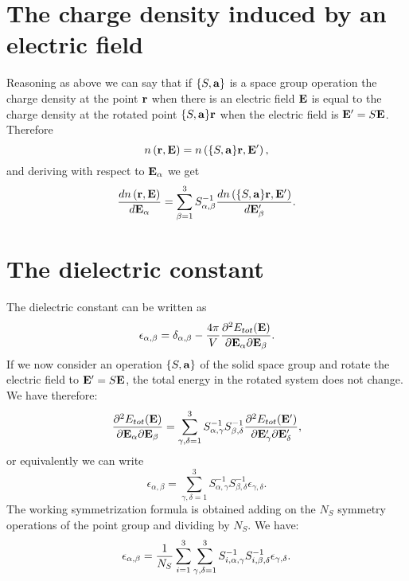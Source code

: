 \documentclass[12pt,a4paper,twoside]{report}
\begin{document}
\section{The charge density induced by an electric field}
Reasoning as above we can say that if $\{S,{\bf a}\}$ is a space group operation the charge density
at the point ${\bf r}$ when there is an electric field ${\bf E}$ is equal to the charge density at the rotated point  $\{S,{\bf a}\}{\bf r}$ when the electric field
is ${\bf E}'=S {\bf E}$. Therefore
\begin{equation}
n\left({\bf r}, {\bf E}\right)
=n\left(\{S,{\bf a}\} {\bf r}, {\bf E}'\right), 
\end{equation}
and deriving with respect to ${\bf E}_\alpha$ we get
\begin{equation}
{d n\left({\bf r}, {\bf E}\right)
\over d {\bf E}_\alpha }=\sum_{\beta=1}^3 S^{-1}_{\alpha,\beta} {d n\left(\{S,{\bf a}\} {\bf r}, {\bf E}'\right)
\over d {\bf E}'_\beta }.
\end{equation}

\section{The dielectric constant}
The dielectric constant can be written as 
\begin{equation}
\epsilon_{\alpha,\beta}=\delta_{\alpha,\beta} -{4 \pi
\over V} {\partial^2 E_{tot} ({\bf E}) \over \partial {\bf E}_\alpha \partial {\bf E}_\beta}.
\end{equation}
If we now consider an operation $\{S,{\bf a}\}$ of the solid space group and rotate the electric field to ${\bf E}'=S{\bf E}$, the total energy in the rotated system does not change. We have therefore:
\begin{equation}
{\partial^2 E_{tot} ({\bf E}) \over \partial {\bf E}_\alpha \partial {\bf E}_\beta}=\sum_{\gamma,\delta=1}^3
S^{-1}_{\alpha,\gamma} S^{-1}_{\beta,\delta}
{\partial^2 E_{tot} ({\bf E}') \over \partial {\bf E}'_\gamma \partial {\bf E}'_\delta},
\end{equation}
or equivalently we can write
\begin{equation}
\epsilon_{\alpha,\beta}=\sum_{\gamma,\delta=1}^3
S^{-1}_{\alpha,\gamma} S^{-1}_{\beta,\delta}
\epsilon_{\gamma,\delta}.
\end{equation}
The working symmetrization formula is obtained adding on the $N_S$ symmetry operations of the point group
and dividing by $N_S$. We have:
\begin{equation}
\epsilon_{\alpha,\beta}= {1 \over N_S} \sum_{i=1}^3
\sum_{\gamma,\delta=1}^3 S^{-1}_{i,\alpha,\gamma}
S^{-1}_{i,\beta,\delta}
\epsilon_{\gamma,\delta}.
\label{symepsilon}
\end{equation}
\end{document}
